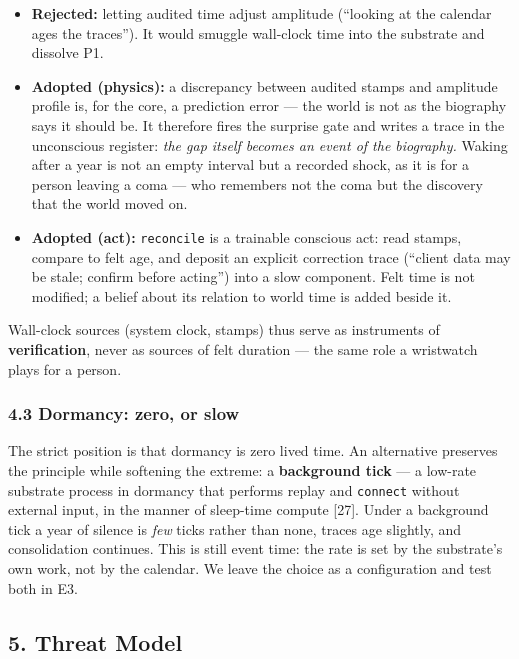 \documentclass[
]{article}
\newcounter{none} %
\providecommand{\tightlist}{%
  \setlength{\itemsep}{0pt}\setlength{\parskip}{0pt}}
\begin{document}
\begin{itemize}
\tightlist
\item
  \textbf{Rejected:} letting audited time adjust amplitude (``looking at
  the calendar ages the traces''). It would smuggle wall-clock time into
  the substrate and dissolve P1.
\item
  \textbf{Adopted (physics):} a discrepancy between audited stamps and
  amplitude profile is, for the core, a prediction error --- the world
  is not as the biography says it should be. It therefore fires the
  surprise gate and writes a trace in the unconscious register:
  \emph{the gap itself becomes an event of the biography.} Waking after
  a year is not an empty interval but a recorded shock, as it is for a
  person leaving a coma --- who remembers not the coma but the discovery
  that the world moved on.
\item
  \textbf{Adopted (act):} \texttt{reconcile} is a trainable conscious
  act: read stamps, compare to felt age, and deposit an explicit
  correction trace (``client data may be stale; confirm before acting'')
  into a slow component. Felt time is not modified; a belief about its
  relation to world time is added beside it.
\end{itemize}

Wall-clock sources (system clock, stamps) thus serve as instruments of
\textbf{verification}, never as sources of felt duration --- the same
role a wristwatch plays for a person.

\subsubsection{4.3 Dormancy: zero, or slow}\label{dormancy-zero-or-slow}

The strict position is that dormancy is zero lived time. An alternative
preserves the principle while softening the extreme: a
\textbf{background tick} --- a low-rate substrate process in dormancy
that performs replay and \texttt{connect} without external input, in the
manner of sleep-time compute {[}27{]}. Under a background tick a year of
silence is \emph{few} ticks rather than none, traces age slightly, and
consolidation continues. This is still event time: the rate is set by
the substrate's own work, not by the calendar. We leave the choice as a
configuration and test both in E3.

\subsection{5. Threat Model}\label{threat-model}
\end{document}
